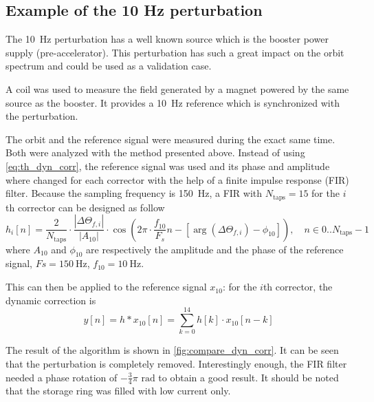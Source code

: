 \subsection{Example of the 10 Hz perturbation}
\label{sec:dyn_corr_ex_10Hz}
The \SI{10}{\hertz} perturbation has a well known source which is the booster power supply (pre-accelerator). This perturbation has such a great impact on the orbit spectrum and could be used as a validation case.

A coil was used to measure the field generated by a magnet powered by the same source as the booster. It provides a \SI{10}{\hertz} reference which is synchronized with the perturbation.

The orbit and the reference signal were measured during the exact same time. Both were analyzed with the method presented above. Instead of using \cref{eq:th_dyn_corr}, the reference signal was used and its phase and amplitude where changed for each corrector with the help of a finite impulse response (FIR) filter. Because the sampling frequency is \SI{150}{\hertz}, a FIR with $N_\text{taps} = 15$ for the $i$th corrector can be designed as follow
\begin{equation}
	h_i[n] = \frac{2}{N_\text{taps}}\cdot \frac{\left| \Delta\Theta_{f,i} \right|}{\left|A_{10}\right|} \cdot \cos\left(2\pi\cdot \frac{f_{10}}{F_s} n - \left[\arg\left(\Delta\Theta_{f,i}\right) - \phi_{10}\right] \right),\quad n \in 0..N_\text{taps}-1
\end{equation}
where $A_{10}$ and $\phi_{10}$ are respectively the amplitude and the phase of the reference signal, $Fs=\SI{150}{\hertz}$, $f_{10}=\SI{10}{\hertz}$.

This can then be applied to the reference signal $x_{10}$: for the $i$th corrector, the dynamic correction is
\begin{equation}
y[n] = h * x_{10} [n] =  \sum\limits_{k=0}^{14} h[k] \cdot x_{10}[n-k]
\end{equation}

The result of the algorithm is shown in \cref{fig:compare_dyn_corr}. It can be seen that the perturbation is completely removed. Interestingly enough, the FIR filter needed a phase rotation of $-\frac{3}{4}\pi \text{~rad}$ to obtain a good result. It should be noted that the storage ring was filled with low current only.

